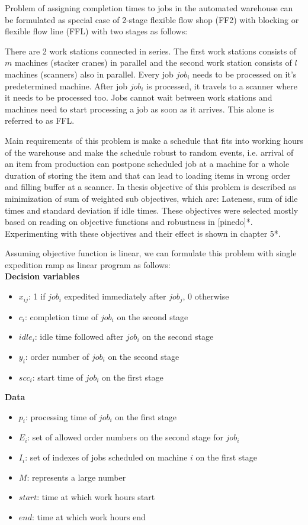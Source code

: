\documentclass{ctuthesis}
\begin{document}
Problem of assigning completion times to jobs in the automated warehouse can be formulated as special case of 2-stage flexible flow shop (FF2) with blocking or flexible flow line (FFL) with two stages as follows:

There are 2 work stations connected in series. The first work stations consists of $m$ machines (stacker cranes) in parallel and the second work station consists of $l$ machines (scanners) also in parallel. Every job $job_i$ needs to be processed on it's predetermined machine. After job $job_i$ is processed, it travels to a scanner where it needs to be processed too. Jobs cannot wait between work stations and machines need to start processing a job as soon as it arrives. This alone is referred to as FFL.

Main requirements of this problem is make a schedule that fits into working hours of the warehouse and make the schedule robust to random events, i.e. arrival of an item from production can postpone scheduled job at a machine for a whole duration of storing the item and that can lead to loading items in wrong order and filling buffer at a scanner. In thesis objective of this problem is described as minimization of sum of weighted sub objectives, which are: Lateness, sum of idle times and standard deviation if idle times. These objectives were selected mostly based on reading on objective functions and robustness in [pinedo]*. Experimenting with these objectives and their effect is shown in chapter 5*.

Assuming objective function is linear, we can formulate this problem with single expedition ramp as linear program as follows:
\\

\textbf{Decision variables}

\begin{itemize}
\item $x_{ij}$: 1 if $job_i$ expedited immediately after $job_j$, 0 otherwise
\item$c_i$: completion time of $job_i$ on the second stage
\item$idle_i$: idle time followed after $job_i$ on the second stage
\item$y_i$: order number of $job_i$ on the second stage
\item$scc_i$: start time of $job_i$ on the first stage 
\end{itemize}
\textbf{Data}
\begin{itemize}
\item$p_i$: processing time of $job_i$ on the first stage
\item$E_i$: set of allowed order numbers on the second stage for $job_i$
\item$I_i$: set of indexes of jobs scheduled on machine $i$ on the first stage
\item$M$: represents a large number
\item$start$: time at which work hours start
\item$end$: time at which work hours end
\end{itemize}
\end{document}
